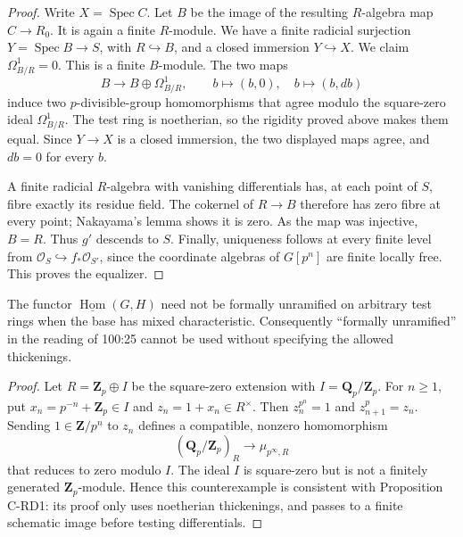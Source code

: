 \begin{proof}
Write $X=\operatorname{Spec}C$. Let $B$ be the image of the resulting
$R$-algebra map $C\to R_0$. It is again a finite $R$-module. We have a
finite radicial surjection $Y=\operatorname{Spec}B\to S$, with
$R\hookrightarrow B$, and a closed immersion $Y\hookrightarrow X$.
We claim $\Omega^1_{B/R}=0$. This is a finite $B$-module. The two maps
\[
 B\longrightarrow B\oplus\Omega^1_{B/R},\qquad
 b\longmapsto(b,0),\quad b\longmapsto(b,db)
\]
induce two $p$-divisible-group homomorphisms that agree modulo the
square-zero ideal $\Omega^1_{B/R}$. The test ring is noetherian, so the
rigidity proved above makes them equal. Since $Y\to X$ is a closed
immersion, the two displayed maps agree, and $db=0$ for every $b$.

A finite radicial $R$-algebra with vanishing differentials has, at each
point of $S$, fibre exactly its residue field. The cokernel of $R\to B$
therefore has zero fibre at every point; Nakayama's lemma shows it is zero.
As the map was injective, $B=R$. Thus $g'$ descends to $S$.
Finally, uniqueness follows at every finite level from
$\mathcal O_S\hookrightarrow f_*\mathcal O_{S'}$, since the coordinate
algebras of $G[p^n]$ are finite locally free. This proves the equalizer.
\end{proof}

\begin{proposition}\label{prop:C-RD2}
The functor $\underline{\operatorname{Hom}}(G,H)$ need not be formally
unramified on arbitrary test rings when the base has mixed characteristic.
Consequently ``formally unramified'' in the reading of 100:25 cannot be
used without specifying the allowed thickenings.
\end{proposition}

\begin{proof}
Let $R=\mathbf Z_p\oplus I$ be the square-zero extension with
$I=\mathbf Q_p/\mathbf Z_p$. For $n\geq1$, put
$x_n=p^{-n}+\mathbf Z_p\in I$ and $z_n=1+x_n\in R^\times$.
Then $z_n^{p^n}=1$ and $z_{n+1}^p=z_n$. Sending $1\in\mathbf Z/p^n$
to $z_n$ defines a compatible, nonzero homomorphism
\[
 (\mathbf Q_p/\mathbf Z_p)_R\longrightarrow\mu_{p^\infty,R}
\]
that reduces to zero modulo $I$. The ideal $I$ is square-zero but is not
a finitely generated $\mathbf Z_p$-module. Hence this counterexample is
consistent with Proposition C-RD1: its proof only uses noetherian
thickenings, and passes to a finite schematic image before testing
differentials.
\end{proof}

